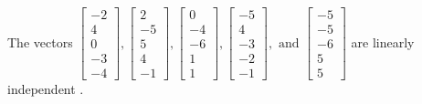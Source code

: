 \begin{exercise}
\begin{exerciseStatement}
  \end{exerciseStatement}
  \begin{exerciseAnswer}
   The vectors \(\left[\begin{array}{r}
-2 \\
4 \\
0 \\
-3 \\
-4
\end{array}\right] , \left[\begin{array}{r}
2 \\
-5 \\
5 \\
4 \\
-1
\end{array}\right] , \left[\begin{array}{r}
0 \\
-4 \\
-6 \\
1 \\
1
\end{array}\right] , \left[\begin{array}{r}
-5 \\
4 \\
-3 \\
-2 \\
-1
\end{array}\right] , \text{ and } \left[\begin{array}{r}
-5 \\
-5 \\
-6 \\
5 \\
5
\end{array}\right]\) are 
  	 linearly independent  .
  


  \end{exerciseAnswer}
\end{exercise}